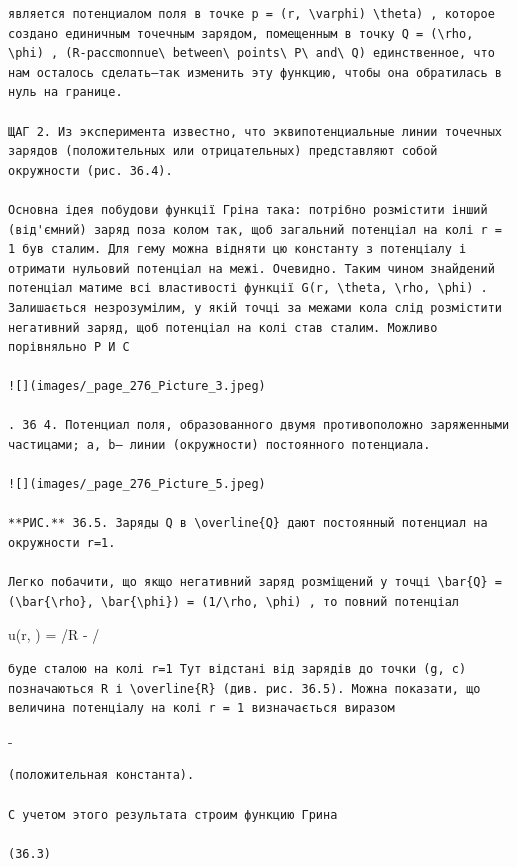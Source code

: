 \documentclass[
  ukrainian,
]{article}
\begin{document}
 \ln {}

\begin{verbatim}
является потенциалом поля в точке p = (r, \varphi) \theta) , которое создано единичным точечным зарядом, помещенным в точку Q = (\rho, \phi) , (R-paccmonnue\ between\ points\ P\ and\ Q) единственное, что нам осталось сделать—так изменить эту функцию, чтобы она обратилась в нуль на границе.

ЩАГ 2. Из эксперимента известно, что эквипотенциальные линии точечных зарядов (положительных или отрицательных) представляют собой окружности (рис. 36.4).

Основна ідея побудови функції Гріна така: потрібно розмістити інший (від'ємний) заряд поза колом так, щоб загальний потенціал на колі r = 1 був сталим. Для гему можна відняти цю константу з потенціалу і отримати нульовий потенціал на межі. Очевидно. Таким чином знайдений потенціал матиме всі властивості функції G(r, \theta, \rho, \phi) . Залишається незрозумілим, у якій точці за межами кола слід розмістити негативний заряд, щоб потенціал на колі став сталим. Можливо порівняльно P И С

![](images/_page_276_Picture_3.jpeg)

. 36 4. Потенциал поля, образованного двумя противоположно заряженными частицами; a, b— линии (окружности) постоянного потенциала.

![](images/_page_276_Picture_5.jpeg)

**РИС.** 36.5. Заряды Q в \overline{Q} дают постоянный потенциал на окружности r=1.

Легко побачити, що якщо негативний заряд розміщений у точці \bar{Q} = (\bar{\rho}, \bar{\phi}) = (1/\rho, \phi) , то повний потенціал
\end{verbatim}

u(r, \theta) =  /R - 
/

\begin{verbatim}
буде сталою на колі r=1 Тут відстані від зарядів до точки (g, c) позначаються R і \overline{R} (див. рис. 36.5). Можна показати, що величина потенціалу на колі r = 1 визначається виразом
\end{verbatim}

-\ln\rho

\begin{verbatim}
(положительная константа).

С учетом этого результата строим функцию Грина

(36.3)
\end{verbatim}
\end{document}
